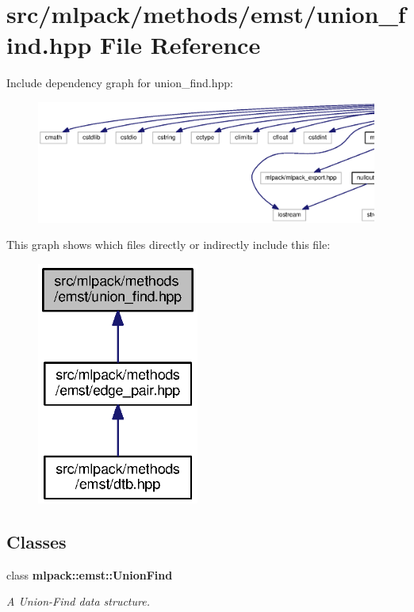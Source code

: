 \section{src/mlpack/methods/emst/union\+\_\+find.hpp File Reference}
\label{union__find_8hpp}
Include dependency graph for union\+\_\+find.\+hpp\+:
\nopagebreak
\begin{figure}[H]
\begin{center}
\leavevmode
\includegraphics[width=350pt]{union__find_8hpp__incl}
\end{center}
\end{figure}
This graph shows which files directly or indirectly include this file\+:
\nopagebreak
\begin{figure}[H]
\begin{center}
\leavevmode
\includegraphics[width=151pt]{union__find_8hpp__dep__incl}
\end{center}
\end{figure}
\subsection*{Classes}
\begin{DoxyCompactItemize}
\item 
class {\bf mlpack\+::emst\+::\+Union\+Find}
\begin{DoxyCompactList}\small\item\em A Union-\/\+Find data structure. \end{DoxyCompactList}\end{DoxyCompactItemize}

